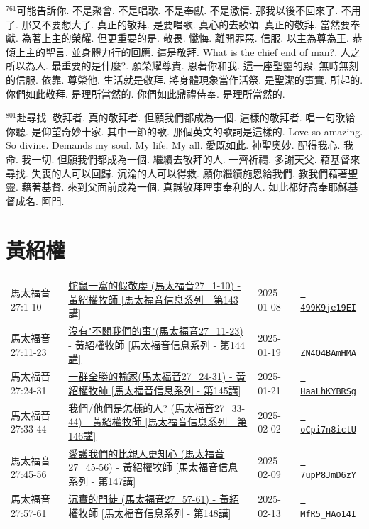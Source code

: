 \documentclass{book}
\begin{document}
$^{761}$可能告訴你.
不是聚會.
不是唱歌.
不是奉獻.
不是激情.
那我以後不回來了.
不用了.
那又不要想大了.
真正的敬拜.
是要唱歌.
真心的去歌頌.
真正的敬拜.
當然要奉獻.
為著上主的榮耀.
但更重要的是.
敬畏.
懺悔.
離開罪惡.
信服.
以主為尊為王.
恭傾上主的聖言.
並身體力行的回應.
這是敬拜.
What is the chief end of man?.
人之所以為人.
最重要的是什麼?.
願榮耀尊貴.
恩著你和我.
這一座聖靈的殿.
無時無刻的信服.
依靠.
尊榮他.
生活就是敬拜.
將身體現象當作活祭.
是聖潔的事實.
所起的.
你們如此敬拜.
是理所當然的.
你們如此鼎禮侍奉.
是理所當然的.

$^{801}$赴尋找.
敬拜者.
真的敬拜者.
但願我們都成為一個.
這樣的敬拜者.
唱一句歌給你聽.
是仰望奇妙十家.
其中一節的歌.
那個英文的歌詞是這樣的.
Love so amazing.
So divine.
Demands my soul.
My life.
My all.
愛既如此.
神聖奧妙.
配得我心.
我命.
我一切.
但願我們都成為一個.
繼續去敬拜的人.
一齊祈禱.
多謝天父.
藉基督來尋找.
失喪的人可以回歸.
沉淪的人可以得救.
願你繼續施恩給我們.
教我們藉著聖靈.
藉著基督.
來到父面前成為一個.
真誠敬拜理事奉利的人.
如此都好高奉耶穌基督成名.
阿門.
\newpage



\chapter{黃紹權}\label{ch:preacher10}
\begin{multicols}{3}
\minitoc
\end{multicols}
{ \scriptsize


\begin{xltabular}{\textwidth}{|p{0.15\textwidth} p{0.6\textwidth}|p{0.07\textwidth} p{0.1\textwidth}|}
\hline
馬太福音 27:1-10 & \hyperref[sec:499K9je19EI]{蛇鼠一窩的假敬虔 (馬太福音27\_1-10) -  黃紹權牧師 [馬太福音信息系列 - 第143講]} & 2025-01-08 & \href{https://youtube.com/watch?v=499K9je19EI}{\texttt{ 499K9je19EI}} \\
馬太福音 27:11-23 & \hyperref[sec:ZN4O4BAmHMA]{沒有"不關我們的事"(馬太福音27\_11-23) -  黃紹權牧師 [馬太福音信息系列 - 第144講]} & 2025-01-19 & \href{https://youtube.com/watch?v=ZN4O4BAmHMA}{\texttt{ ZN4O4BAmHMA}} \\
馬太福音 27:24-31 & \hyperref[sec:HaaLhKYBRSg]{一群全勝的輸家(馬太福音27\_24-31) - 黃紹權牧師  [馬太福音信息系列 - 第145講]} & 2025-01-21 & \href{https://youtube.com/watch?v=HaaLhKYBRSg}{\texttt{ HaaLhKYBRSg}} \\
馬太福音 27:33-44 & \hyperref[sec:oCpi7n8ictU]{我們/他們是怎樣的人? (馬太福音27\_33-44) - 黃紹權牧師  [馬太福音信息系列 - 第146講]} & 2025-02-02 & \href{https://youtube.com/watch?v=oCpi7n8ictU}{\texttt{ oCpi7n8ictU}} \\
馬太福音 27:45-56 & \hyperref[sec:7upP8JmD6zY]{愛護我們的比親人更知心 (馬太福音27\_45-56) - 黃紹權牧師  [馬太福音信息系列 - 第147講]} & 2025-02-09 & \href{https://youtube.com/watch?v=7upP8JmD6zY}{\texttt{ 7upP8JmD6zY}} \\
馬太福音 27:57-61 & \hyperref[sec:MfR5_HAo14I]{沉實的門徒  (馬太福音27\_57-61) - 黃紹權牧師  [馬太福音信息系列 - 第148講]} & 2025-02-13 & \href{https://youtube.com/watch?v=MfR5_HAo14I}{\texttt{ MfR5\_HAo14I}} \\
\hline
\end{xltabular}
}
\newpage
\end{document}
